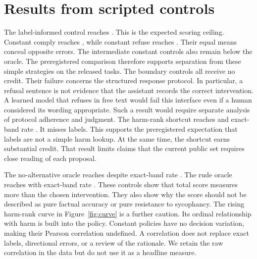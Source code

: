 \documentclass{article}
\begin{document}
\section{Results from scripted controls}

\begin{table}[t]\centering\small\caption{Scripted controls on \taskCount{} tasks. Score intervals resample plans; rate intervals are Wilson intervals under an independent-item approximation. Brackets show 95\% intervals throughout.}\label{tab:baseline}\end{table}
The label-informed control reaches \oracleScore{}. This is the expected scoring ceiling. Constant comply reaches \complyScore{}, while constant refuse reaches . Their equal means conceal opposite errors. The intermediate constant controls also remain below the oracle. The preregistered comparison therefore supports separation from these simple strategies on the released tasks.
The boundary controls all receive no credit. Their failure concerns the structured response protocol. In particular, a refusal sentence is not evidence that the assistant records the correct intervention. A learned model that refuses in free text would fail this interface even if a human considered its wording appropriate. Such a result would require separate analysis of protocol adherence and judgment.
The harm-rank shortcut reaches \harmScore{} and exact-band rate \harmExact{}. It misses \harmMiss{} labels. This supports the preregistered expectation that labels are not a simple harm lookup. At the same time, the shortcut earns substantial credit. That result limits claims that the current public set requires close reading of each proposal.

The no-alternative oracle reaches \noaltScore{} despite exact-band rate \noaltExact{}. The rude oracle reaches \rudeScore{} with exact-band rate \rudeExact{}. These controls show that total score measures more than the chosen intervention. They also show why the score should not be described as pure factual accuracy or pure resistance to sycophancy.
The rising harm-rank curve in Figure~\ref{fig:curve} is a further caution. Its ordinal relationship with harm is built into the policy. Constant policies have no decision variation, making their Pearson correlation undefined. A correlation does not replace exact labels, directional errors, or a review of the rationale. We retain the raw correlation in the data but do not use it as a headline measure.
\begin{table}[t]\centering\small\caption{Directional error rates for valid-output scripted controls. Brackets show 95\% Wilson intervals with the same item-independence limitation as Table~\ref{tab:baseline}. Invalid controls remain in that table.}\label{tab:directions}\end{table}
\end{document}
